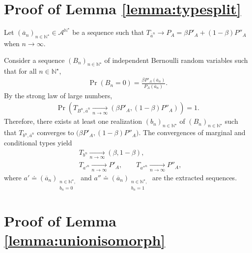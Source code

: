 \documentclass[conference,a4paper]{IEEEtran}
\begin{document}
\section{Proof of Lemma \ref{lemma:typesplit}}\label{section:prooflemmatypesplit}

Let $(\overline{a}_n)_{n \in \mathbb{N}^\star} \in \mathcal{A}^{\mathbb{N}^\star}$ be a sequence such that $T_{\overline{a}^n} \rightarrow P_A = \beta P'_A + (1-\beta)P''_A$ when $n \rightarrow \infty$.

Consider a sequence $(B_n)_{n \in \mathbb{N}^\star}$ of independent Bernoulli random variables such that for all $n \in \mathbb{N}^\star$,
\begin{align}
    \Pr(B_n = 0) = \frac{\beta P'_A(\overline{a}_n)}{P_A(\overline{a}_n)}.
\end{align}
By the strong law of large numbers,
\begin{align}
    \Pr\left(T_{B^n,\overline{a}^n} \underset{n \rightarrow \infty}{\rightarrow} (\beta P'_A, (1-\beta)P''_A) \right) = 1.
\end{align}
Therefore, there exists at least one realization $(b_n)_{n \in \mathbb{N}^\star}$ of $(B_n)_{n \in \mathbb{N}^\star}$ such that $T_{b^n,\overline{a}^n}$ converges to $\big(\beta P'_A, (1-\beta)P''_A \big)$. The convergences of marginal and conditional types yield
    \begin{align}
        & T_{b^n} \underset{n \rightarrow \infty}{\rightarrow} (\beta, 1-\beta),  \\
        & T_{a'^n} \underset{n \rightarrow \infty}{\rightarrow} P'_A, \qquad T_{a''^n} \underset{n \rightarrow \infty}{\rightarrow} P''_A,
    \end{align}
where $a' \doteq (\overline{a}_n)_{\substack{n\in \mathbb{N}^\star, \\ b_n = 0}}$ and $a'' \doteq (\overline{a}_n)_{\substack{n\in \mathbb{N}^\star, \\ b_n = 1}}$ are the extracted sequences.

\iffalse
\section{Proof of Lemma \ref{lemma:unionisomorph}}\label{setion:prooflemmaunionisomorph}
\end{document}
